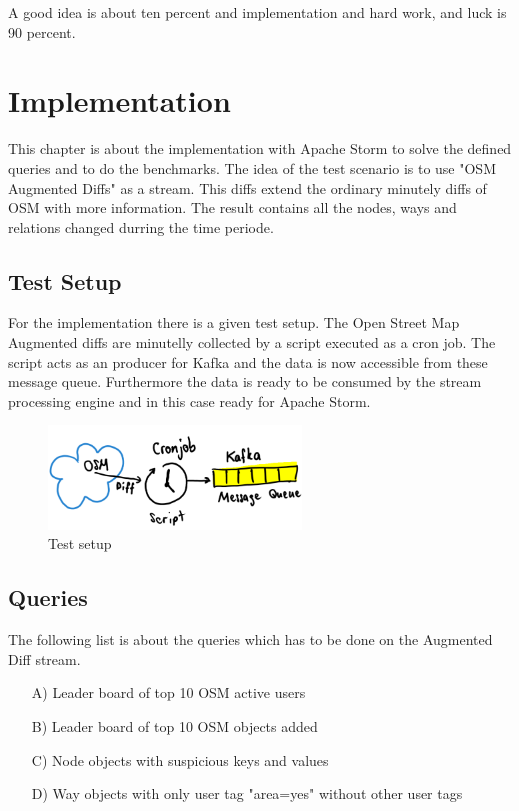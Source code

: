 \begin{savequote}[75mm]
A good idea is about ten percent and implementation and hard work, and luck is 90 percent.
\end{savequote}

\chapter{Implementation}
This chapter is about the implementation with Apache Storm to solve the defined queries and to do the benchmarks.
The idea of the test scenario is to use "OSM Augmented Diffs" as a stream.
This diffs extend the ordinary minutely diffs of OSM with more information.
The result contains all the nodes, ways and relations changed durring the time periode.

\newpage

\section{Test Setup}
For the implementation there is a given test setup.
The Open Street Map Augmented diffs are minutelly collected by a script executed as a cron job.
The script acts as an producer for Kafka and the data is now accessible from these message queue.
Furthermore the data is ready to be consumed by the stream processing engine and in this case ready for Apache Storm.

\begin{figure}[H]
\centering
\captionsetup{justification=centering}
\includegraphics[width=0.6\textwidth]{images/test_setup.png}
\caption[Test setup]{Test setup}
\end{figure}


\section{Queries}
The following list is about the queries which has to be done on the Augmented Diff stream.

\begin{itemize}
\item[A)] Leader board of top 10 OSM active users
\item[B)] Leader board of top 10 OSM objects added
\item[C)] Node objects with suspicious keys and values
\item[D)] Way objects with only user tag "area=yes" without other user tags
\end{itemize}

